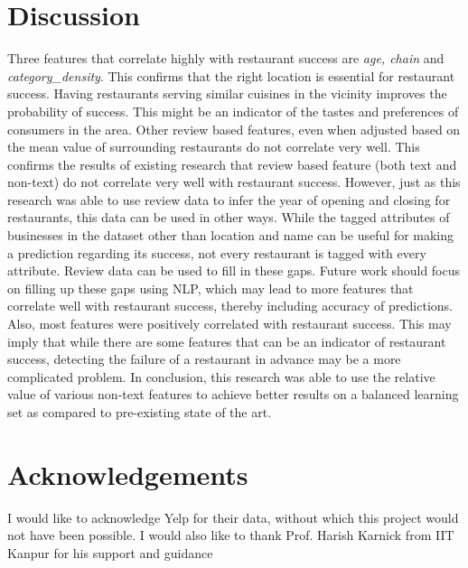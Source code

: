 \documentclass[12pt]{article}
\begin{document}
  \section{Discussion}

  Three features that correlate highly with restaurant success are \emph{age, chain} and \emph{category\_density}. This confirms that the right location is essential for restaurant success. Having restaurants serving similar cuisines in the vicinity improves the probability of success. This might be an indicator of the tastes and preferences of consumers in the area. Other review based features, even when adjusted based on the mean value of surrounding restaurants do not correlate very well. This confirms the results of existing research that review based feature (both text and non-text) do not correlate very well with restaurant success. However, just as this research was able to use review data to infer the year of opening and closing for restaurants, this data can be used in other ways. While the tagged attributes of businesses in the dataset other than location and name can be useful for making a prediction regarding its success, not every restaurant is tagged with every attribute. Review data can be used to fill in these gaps. Future work should focus on filling up these gaps using NLP, which may lead to more features that correlate well with restaurant success, thereby including accuracy of predictions. Also, most features were positively correlated with restaurant success. This may imply that while there are some features that can be an indicator of restaurant success, detecting the failure of a restaurant in advance may be a more complicated problem. In conclusion, this research was able to use the relative value of various non-text features to achieve better results on a balanced learning set as compared to pre-existing state of the art.

  \section{Acknowledgements}

  I would like to acknowledge Yelp for their data, without which this project would not have been possible. I would also like to thank Prof. Harish Karnick from IIT Kanpur for his support and guidance

  \printbibliography
\end{document}
